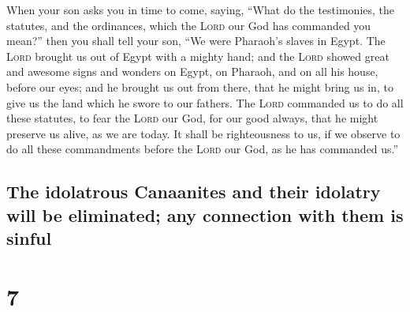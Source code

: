  When your son asks you in time to come, saying, ``What
do the testimonies, the statutes, and the ordinances, which the
\textsc{Lord} our God has commanded you mean?''  then you
shall tell your son, ``We were Pharaoh's slaves in Egypt. The
\textsc{Lord} brought us out of Egypt with a mighty hand;
 and the \textsc{Lord} showed great and awesome signs and
wonders on Egypt, on Pharaoh, and on all his house, before our eyes;
 and he brought us out from there, that he might bring us
in, to give us the land which he swore to our fathers. 
The \textsc{Lord} commanded us to do all these statutes, to fear the
\textsc{Lord} our God, for our good always, that he might preserve us
alive, as we are today.  It shall be righteousness to us,
if we observe to do all these commandments before the \textsc{Lord} our
God, as he has commanded us.''

\hypertarget{the-idolatrous-canaanites-and-their-idolatry-will-be-eliminated-any-connection-with-them-is-sinful}{%
\subsection{The idolatrous Canaanites and their idolatry will be
eliminated; any connection with them is
sinful}\label{the-idolatrous-canaanites-and-their-idolatry-will-be-eliminated-any-connection-with-them-is-sinful}}

\hypertarget{section-6}{%
\section{7}\label{section-6}}

